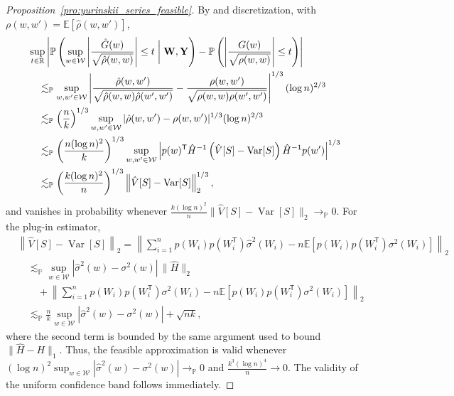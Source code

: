 \documentclass[11pt,lof]{puthesis}
\renewcommand{\P}{\ensuremath{\mathbb{P}}}
\newcommand{\R}{\ensuremath{\mathbb{R}}}
\newcommand{\E}{\ensuremath{\mathbb{E}}}
\newcommand{\bW}{\ensuremath{\mathbf{W}}}
\newcommand{\bY}{\ensuremath{\mathbf{Y}}}
\newcommand{\cW}{\ensuremath{\mathcal{W}}}
\newcommand{\T}{\ensuremath{\mathsf{T}}}
\DeclareMathOperator{\Var}{Var}
\theoremstyle{break}
\theoremstyle{proof}
\newtheorem{proof}{Proof}
\begin{document}
\begin{proof}[Proposition~\ref{pro:yurinskii_series_feasible}]
  By \citet[Lemma~3.1]{chernozhukov2013gaussian} and discretization,
  with $\rho(w,w') = \E[\hat\rho(w,w')]$,
  \begin{align*}
    &\sup_{t \in \R}
    \left|
      \P\left(
        \sup_{w \in \cW}
        \left|
          \frac{\hat G(w)}{\sqrt{\hat\rho(w,w)}}
        \right|
        \leq t \biggm| \bW, \bY
      \right)
      - \P\left(
        \left|
          \frac{G(w)}{\sqrt{\rho(w,w)}}
        \right|
        \leq t
      \right)
    \right| \\
    &\quad\lesssim_\P
    \sup_{w,w' \in \cW}
    \left|
      \frac{\hat\rho(w,w')}
      {\sqrt{\hat\rho(w,w)\hat\rho(w',w')}}
      - \frac{\rho(w,w')}
      {\sqrt{\rho(w,w)\rho(w',w')}}
    \right|^{1/3}
    (\log n)^{2/3} \\
    &\quad\lesssim_\P
    \left(\frac n k \right)^{1/3}
    \sup_{w,w' \in \cW} |\hat\rho(w,w') - \rho(w,w')|^{1/3}
    (\log n)^{2/3} \\
    &\quad\lesssim_\P
    \left( \frac{n (\log n)^2}{k} \right)^{1/3}
    \sup_{w,w' \in \cW}
    \left|
      p(w)^\T \hat H^{-1}
      \left(
        \hat{V}[S]
        - \Var[S]
      \right)
      \hat H^{-1} p(w')
    \right|^{1/3} \\
    &\quad\lesssim_\P
    \left( \frac{k (\log n)^2}{n} \right)^{1/3}
    \left\|
      \hat{V}[S]
      - \Var[S]
    \right\|_2^{1/3},
  \end{align*}
  and vanishes in probability whenever
  $\frac{k (\log n)^2}{n}
  \big\| \hat{V}[S] - \Var[S] \big\|_2 \to_\P 0$.
  For the plug-in estimator,
  \begin{align*}
    &\left\|
      \hat{V}[S]
      - \Var[S]
    \right\|_2
    =
    \left\|
      \sum_{i=1}^n
      p(W_i) p(W_i^\T)
      \hat\sigma^2(W_i)
      - n \E\left[
        p(W_i) p(W_i^\T)
        \sigma^2(W_i)
      \right]
    \right\|_2 \\
    &\quad\lesssim_\P
    \sup_{w \in \cW}
    |\hat{\sigma}^2(w)-\sigma^2(w)|
    \, \big\| \hat H \big\|_2 \\
    &\qquad+
    \left\|
      \sum_{i=1}^n
      p(W_i) p(W_i^\T)
      \sigma^2(W_i)
      - n \E\left[
        p(W_i) p(W_i^\T)
        \sigma^2(W_i)
      \right]
    \right\|_2 \\
    &\quad\lesssim_\P
    \frac{n}{k}
    \sup_{w \in \cW}
    |\hat{\sigma}^2(w)-\sigma^2(w)|
    + \sqrt{n k},
  \end{align*}
  where the second term is bounded by the same argument
  used to bound $\|\hat H - H\|_1$.
  Thus, the feasible approximation is valid whenever
  $(\log n)^2 \sup_{w \in \cW}
  |\hat{\sigma}^2(w)-\sigma^2(w)| \to_\P 0$
  and $\frac{k^3 (\log n)^4}{n} \to 0$.
  The validity of the uniform confidence band follows immediately.
\end{proof}
\end{document}
